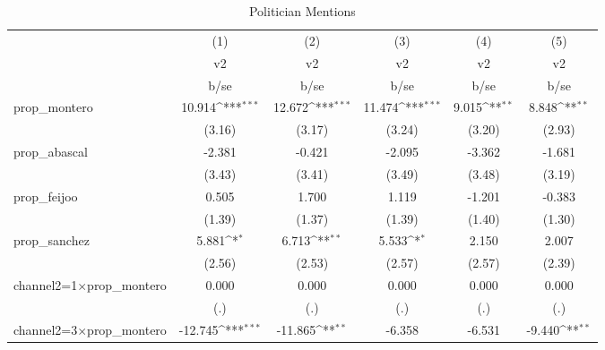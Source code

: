 \begin{table}[htbp]\centering
\def\sym#1{\ifmmode^{#1}\else\(^{#1}\)\fi}
\caption{Politician Mentions \label{table\_pol }}
\begin{tabular}{l*{5}{c}}
\toprule
                    &\multicolumn{1}{c}{(1)}&\multicolumn{1}{c}{(2)}&\multicolumn{1}{c}{(3)}&\multicolumn{1}{c}{(4)}&\multicolumn{1}{c}{(5)}\\
                    &\multicolumn{1}{c}{v2}&\multicolumn{1}{c}{v2}&\multicolumn{1}{c}{v2}&\multicolumn{1}{c}{v2}&\multicolumn{1}{c}{v2}\\
                    &        b/se         &        b/se         &        b/se         &        b/se         &        b/se         \\
\midrule
prop\_montero        &      10.914\sym{***}&      12.672\sym{***}&      11.474\sym{***}&       9.015\sym{**} &       8.848\sym{**} \\
                    &      (3.16)         &      (3.17)         &      (3.24)         &      (3.20)         &      (2.93)         \\
prop\_abascal        &      -2.381         &      -0.421         &      -2.095         &      -3.362         &      -1.681         \\
                    &      (3.43)         &      (3.41)         &      (3.49)         &      (3.48)         &      (3.19)         \\
prop\_feijoo         &       0.505         &       1.700         &       1.119         &      -1.201         &      -0.383         \\
                    &      (1.39)         &      (1.37)         &      (1.39)         &      (1.40)         &      (1.30)         \\
prop\_sanchez        &       5.881\sym{*}  &       6.713\sym{**} &       5.533\sym{*}  &       2.150         &       2.007         \\
                    &      (2.56)         &      (2.53)         &      (2.57)         &      (2.57)         &      (2.39)         \\
channel2=1$\times$prop\_montero&       0.000         &       0.000         &       0.000         &       0.000         &       0.000         \\
                    &         (.)         &         (.)         &         (.)         &         (.)         &         (.)         \\
channel2=3$\times$prop\_montero&     -12.745\sym{***}&     -11.865\sym{**} &      -6.358         &      -6.531         &      -9.440\sym{**} \\

\end{tabular}
\end{table}
